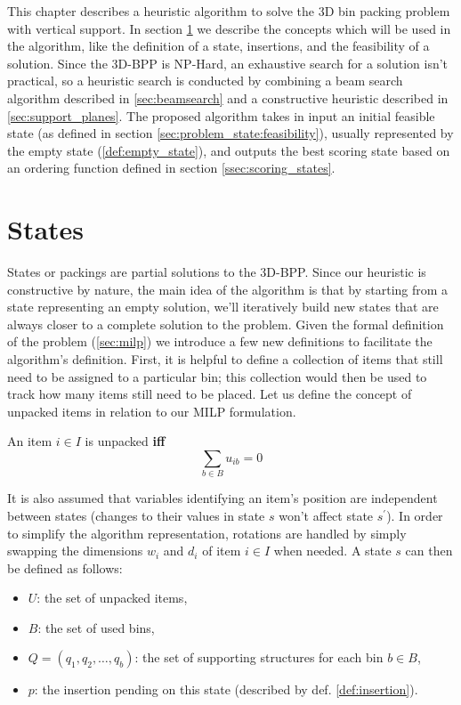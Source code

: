 This chapter describes a heuristic algorithm to solve the 3D bin packing problem with vertical support.
In section \ref{sec:problem_state} we describe the concepts which will be used in the algorithm, like the definition of a state, insertions, and the feasibility of a solution.
Since the 3D-BPP is NP-Hard, an exhaustive search for a solution isn't practical, so a heuristic search is conducted by combining a beam search algorithm described in \cref{sec:beamsearch} and a constructive heuristic described in \cref{sec:support_planes}.
The proposed algorithm takes in input an initial feasible state (as defined in section \ref{sec:problem_state:feasibility}), usually represented by the empty state (\ref{def:empty_state}), and outputs the best scoring state based on an ordering function defined in section \ref{ssec:scoring_states}.

\section{States}
\label{sec:problem_state}%
States or packings are partial solutions to the 3D-BPP. Since our heuristic is constructive by nature, the main idea of the algorithm is that by starting from a state representing an empty solution, we'll iteratively build new states that are always closer to a complete solution to the problem.
Given the formal definition of the problem (\ref{sec:milp}) we introduce a few new definitions to facilitate the algorithm's definition.
First, it is helpful to define a collection of items that still need to be assigned to a particular bin; this collection would then be used to track how many items still need to be placed.
Let us define the concept of unpacked items in relation to our MILP formulation.
\begin{definition}
    An item $i \in I$ is unpacked \textbf{iff}
    \begin{equation*}
        \sum_{b \in B} u_{ib} = 0
    \end{equation*}
\end{definition}

It is also assumed that variables identifying an item's position are independent between states (changes to their values in state $s$ won't affect state $s^\prime$).
In order to simplify the algorithm representation, rotations are handled by simply swapping the dimensions $w_i$ and $d_i$ of item $i \in I$ when needed.
A state $s$ can then be defined as follows:
\begin{itemize}
    \item $U$: the set of unpacked items,
    \item $B$: the set of used bins,
    \item $Q = (q_1, q_2,\dots, q_b)$: the set of supporting structures for each bin $b \in B$,
    \item $p$: the insertion pending on this state (described by def. \ref{def:insertion}).
\end{itemize}

